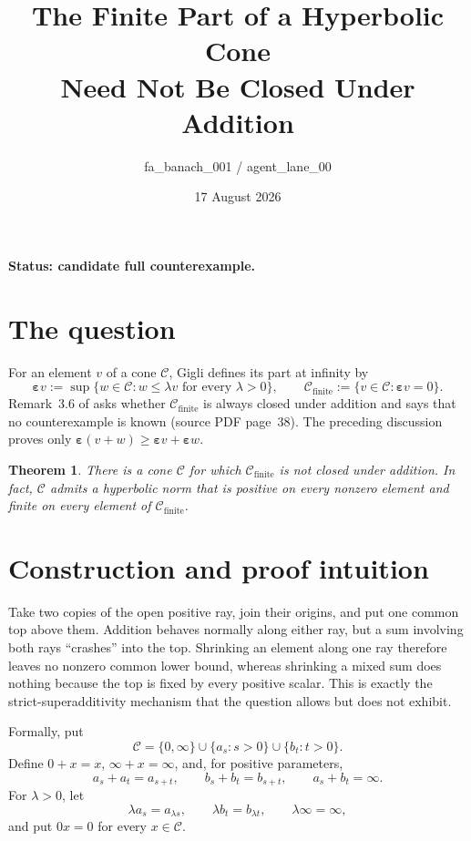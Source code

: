 \documentclass[11pt]{article}
\title{The Finite Part of a Hyperbolic Cone\\Need Not Be Closed Under Addition}
\author{fa\_banach\_001 / agent\_lane\_00}
\date{17 August 2026}
\newtheorem{theorem}{Theorem}
\newcommand{\C}{\mathcal C}
\newcommand{\Fin}{\mathcal C_{\mathrm{finite}}}
\newcommand{\epsp}{\boldsymbol\varepsilon}
\newcommand{\topel}{\boldsymbol\infty}
\begin{document}
\maketitle
\vspace{-1.1em}

\noindent\textbf{Status: candidate full counterexample.}

\section{The question}

For an element $v$ of a cone $\C$, Gigli defines its part at infinity by
\[
 \epsp v:=\sup\{w\in\C:w\leq \lambda v\text{ for every }\lambda>0\},
 \qquad
 \Fin:=\{v\in\C:\epsp v=0\}.
\]
Remark~3.6 of \cite{Gigli} asks whether $\Fin$ is always closed under
addition and says that no counterexample is known (source PDF page~38).
The preceding discussion proves only
$\epsp(v+w)\geq\epsp v+\epsp w$.

\begin{theorem}\label{thm:main}
There is a cone $\C$ for which $\Fin$ is not closed under addition.  In fact,
$\C$ admits a hyperbolic norm that is positive on every nonzero element and
finite on every element of $\Fin$.
\end{theorem}

\section{Construction and proof intuition}

Take two copies of the open positive ray, join their origins, and put one
common top above them.  Addition behaves normally along either ray, but a
sum involving both rays ``crashes'' into the top.  Shrinking an element along
one ray therefore leaves no nonzero common lower bound, whereas shrinking a
mixed sum does nothing because the top is fixed by every positive scalar.
This is exactly the strict-superadditivity mechanism that the question
allows but does not exhibit.

Formally, put
\[
 \C=\{0,\topel\}\cup\{a_s:s>0\}\cup\{b_t:t>0\}.
\]
Define $0+x=x$, $\topel+x=\topel$, and, for positive parameters,
\begin{equation}\label{eq:addition}
 a_s+a_t=a_{s+t},\qquad b_s+b_t=b_{s+t},\qquad a_s+b_t=\topel.
\end{equation}
For $\lambda>0$, let
\begin{equation}\label{eq:scalars}
 \lambda a_s=a_{\lambda s},\qquad
 \lambda b_t=b_{\lambda t},\qquad
 \lambda\topel=\topel,
\end{equation}
and put $0x=0$ for every $x\in\C$.
\end{document}

